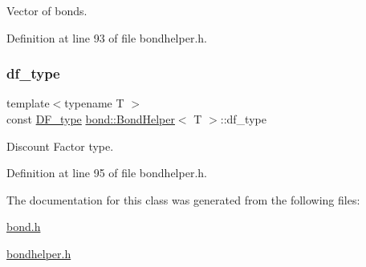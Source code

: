 Vector of bonds. 



Definition at line 93 of file bondhelper.\+h.

\mbox{\label{classbond_1_1_bond_helper_a843e3c12a561aaac047ba70310375a2f}} 
\subsubsection{\texorpdfstring{df\+\_\+type}{df\_type}}
{\footnotesize\ttfamily template$<$typename T $>$ \\
const \hyperlink{namespaceutilities_ad4290e607d0651ce53db6e5c776aca7c}{D\+F\+\_\+type} \hyperlink{classbond_1_1_bond_helper}{bond\+::\+Bond\+Helper}$<$ T $>$\+::df\+\_\+type\hspace{0.3cm}{\ttfamily [private]}}



Discount Factor type. 



Definition at line 95 of file bondhelper.\+h.



The documentation for this class was generated from the following files\+:\begin{DoxyCompactItemize}
\item 
\hyperlink{bond_8h}{bond.\+h}\item 
\hyperlink{bondhelper_8h}{bondhelper.\+h}\end{DoxyCompactItemize}
